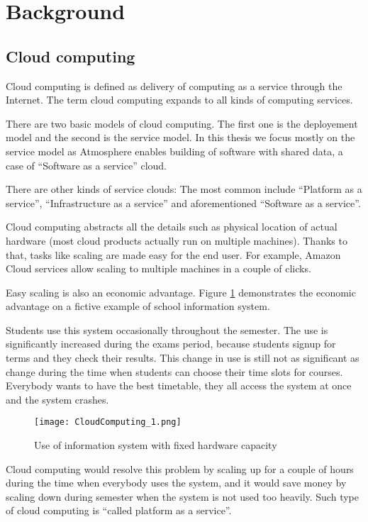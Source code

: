 \section{Background}

\subsection{Cloud computing}

Cloud computing is defined as delivery of computing as a service through the Internet. The term cloud computing expands to all kinds of computing services.

There are two basic models of cloud computing. The first one is the deployement model and the second is the service model. In this thesis we focus mostly on the service model as Atmosphere enables building of software with shared data, a case of ``Software as a service'' cloud. 

There are other kinds of service clouds: The most common include ``Platform as a service'', ``Infrastructure as a service'' and aforementioned ``Software as a service''.

Cloud computing abstracts all the details such as physical location of actual hardware (most cloud products actually run on multiple machines). Thanks to that, tasks like scaling are made easy for the end user. For example, Amazon Cloud services allow scaling to multiple machines in a couple of clicks. \citep{amazon}

Easy scaling is also an economic advantage. Figure \ref{fig:1} demonstrates the economic advantage on a fictive example of school information system.

Students use this system occasionally throughout the semester. The use is significantly increased during the exams period, because students signup for terms and they check their results. This change in use is still not as significant as change during the time when students can choose their time slots for courses. Everybody wants to have the best timetable, they all access the system at once and the system crashes.

\begin{figure}[ht!]
\centering
\texttt{[image: CloudComputing\_1.png]}
\caption{Use of information system with fixed hardware capacity \label{fig:1}}
\end{figure}

Cloud computing would resolve this problem by scaling up for a couple of hours during the time when everybody uses the system, and it would save money by scaling down during semester when the system is not used too heavily. Such type of cloud computing is ``called platform as a service''. \citep{paas}

